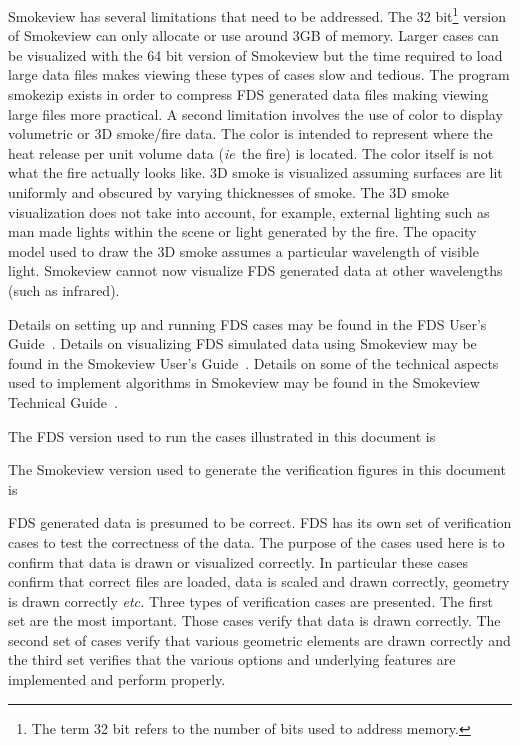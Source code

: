 \documentclass[11pt,twoside]{book}
\begin{document}
Smokeview has several limitations that need to be addressed.  The
32 bit\footnote{The term 32 bit refers to the number of bits used to address memory.}
version of Smokeview can only allocate or use around 3GB of memory.  Larger cases can be visualized
with the 64 bit version of Smokeview but the time required to load large data files makes viewing these types of cases slow and tedious.  The program smokezip exists in order to compress FDS generated data files making viewing large files more practical.  A second limitation involves the use of color to display volumetric or 3D smoke/fire data.  The color is intended to represent where the heat release per unit volume data ({\em ie}\ the fire) is located.  The color itself is not what the fire actually looks like.  3D smoke is visualized assuming surfaces are lit uniformly and obscured by varying thicknesses of smoke.  The 3D smoke visualization does not take into account, for example, external lighting such as man made lights within the scene or light generated by the fire.  The opacity model used to draw the 3D smoke assumes a particular wavelength of visible light. Smokeview cannot now visualize FDS generated data at other wavelengths (such as infrared).

Details on setting up and
running FDS cases may be found in the FDS User's
Guide~\cite{FDS_Users_Guide_5}.  Details on visualizing FDS simulated data using Smokeview may
be found in the Smokeview User's Guide~\cite{Smokeview_Users_Guide_5}.  Details on some of the technical
aspects used to implement algorithms in Smokeview may be found in the Smokeview Technical Guide~\cite{Smokeview_Tech_Guide_5}.

The FDS version used to run the cases illustrated  in this document
is
{

}

The Smokeview version used to generate the verification figures in this document is
{

}

FDS generated data is presumed
to be correct.  FDS has its own set of verification cases to test the correctness of the data.
The purpose of the cases used here is to confirm that data is drawn or visualized correctly.
In particular these cases confirm
that correct files are loaded, data is scaled and drawn correctly, geometry is drawn correctly
{\em etc.}   Three types of verification cases are presented. The first set are the most important. Those cases verify that data is drawn correctly.  The second set of
cases verify that various geometric elements are drawn correctly and the third set verifies
that the various options and underlying features are implemented and perform properly.
\end{document}
